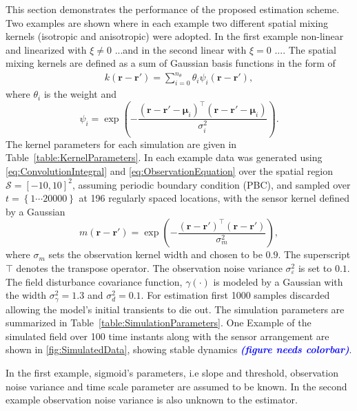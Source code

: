 \documentclass[10pt,twocolumn,twoside]{IEEEtran}
\newcommand{\parham}[1]{\textsf{\emph{\textbf{\textcolor{blue}{#1}}}}}
\begin{document}
This section demonstrates the performance of the proposed estimation scheme. Two examples are shown where in each example two different spatial mixing kernels (isotropic and anisotropic) were adopted. In the first example non-linear and linearized with $\xi\neq 0$ ...and in the second linear with $\xi=0$ .... The spatial mixing kernels are defined as a sum of Gaussian basis functions in the form of
\begin{align}\label{eq:sumofGaussians}
 k\left(\mathbf{r}-\mathbf{r}'\right)=\sum_{i=0}^{n_{\theta}}\theta_i\psi_i\left(\mathbf{r}-\mathbf{r}'\right), 
 \end{align}
where $\theta_i$ is the weight and
\begin{equation}\label{eq:Kernelbasis}
	\psi_i=\exp{\left(-\frac{(\mathbf{r}-\mathbf{r}'-\boldsymbol\mu_i)^\top(\mathbf{r}-\mathbf{r}'-\boldsymbol\mu_i)}{\sigma_i^2}\right)}.
\end{equation}
The kernel parameters for each simulation are given in Table~\ref{table:KernelParameters}. In each example data was generated using \eqref{eq:ConvolutionIntegral} and \eqref{eq:ObservationEquation} over the spatial region $\mathcal{S}=[-10,10]^2 $, assuming periodic boundary condition (PBC), and sampled over $t=\left\lbrace1 \cdots 20000  \right\rbrace $ at 196 regularly spaced locations, with the sensor kernel defined by a Gaussian
\begin{equation}\label{eq:observationkernel}
 	m\left(\mathbf{r}-\mathbf{r}'\right) = \exp{\left(-\frac{(\mathbf{r}-\mathbf{r}')^\top(\mathbf{r}-\mathbf{r}')}{\sigma_m^2}\right)},
 \end{equation} 
 where $\sigma_m$ sets the observation kernel width and chosen to be $0.9$. The superscript $\top$ denotes the transpose operator. The observation noise variance $\sigma_{\varepsilon}^2$ is set to $0.1$. The field disturbance covariance function, $\gamma(\cdot)$ is modeled by a Gaussian with the width $\sigma_{\gamma}^2=1.3$ and $\sigma_d^2=0.1$. For estimation first 1000 samples discarded allowing the model's initial transients to die out.  The simulation parameters are summarized in Table~\ref{table:SimulationParameters}. One Example of the simulated field over 100 time instants along with the sensor arrangement are shown in \figurename{\ref{fig:SimulatedData}}, showing stable dynamics \parham{(figure needs colorbar)}.

In the first example, sigmoid's parameters, i.e slope and threshold, observation noise variance and time scale parameter are assumed to be known. In the second example observation noise variance is also unknown to the estimator.
\end{document}
